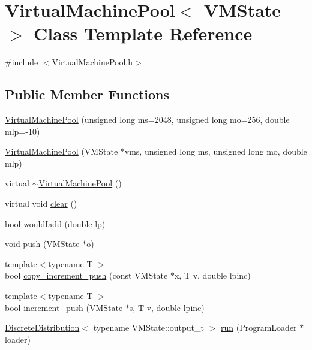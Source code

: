 \hypertarget{class_virtual_machine_pool}{}\section{Virtual\+Machine\+Pool$<$ V\+M\+State $>$ Class Template Reference}
\label{class_virtual_machine_pool}


{\ttfamily \#include $<$Virtual\+Machine\+Pool.\+h$>$}

\subsection*{Public Member Functions}
\begin{DoxyCompactItemize}
\item 
\hyperlink{class_virtual_machine_pool_a2187554e3a4fd48ebe7ea6712e161e01}{Virtual\+Machine\+Pool} (unsigned long ms=2048, unsigned long mo=256, double mlp=-\/10)
\item 
\hyperlink{class_virtual_machine_pool_a84ea4b824ccc758de7de7c81d839c694}{Virtual\+Machine\+Pool} (V\+M\+State $\ast$vms, unsigned long ms, unsigned long mo, double mlp)
\item 
virtual \hyperlink{class_virtual_machine_pool_a3e3709bc5ddf3535497c2d69d04d56c3}{$\sim$\+Virtual\+Machine\+Pool} ()
\item 
virtual void \hyperlink{class_virtual_machine_pool_a9725415d6cff1c51d78545e7c905af8c}{clear} ()
\item 
bool \hyperlink{class_virtual_machine_pool_a752c495b7c6f3ace8a3325eab6529ad1}{would\+Iadd} (double lp)
\item 
void \hyperlink{class_virtual_machine_pool_a38ea4101bc00bd70d260737a0a459bfe}{push} (V\+M\+State $\ast$o)
\item 
{\footnotesize template$<$typename T $>$ }\\bool \hyperlink{class_virtual_machine_pool_a12fc289f4e95e856416aa5ea55389f30}{copy\+\_\+increment\+\_\+push} (const V\+M\+State $\ast$x, T v, double lpinc)
\item 
{\footnotesize template$<$typename T $>$ }\\bool \hyperlink{class_virtual_machine_pool_a9abc6f6dd10e40b4424dd457eab63180}{increment\+\_\+push} (V\+M\+State $\ast$s, T v, double lpinc)
\item 
\hyperlink{class_discrete_distribution}{Discrete\+Distribution}$<$ typename V\+M\+State\+::output\+\_\+t $>$ \hyperlink{class_virtual_machine_pool_a60720f1bfee6cd0c6e6e5153f4f5a58f}{run} (Program\+Loader $\ast$loader)
\end{DoxyCompactItemize}
